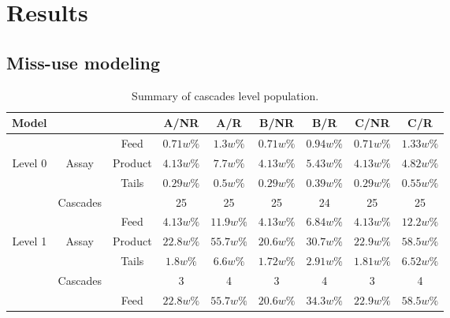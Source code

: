 \section{Results}

\subsection{Miss-use modeling}

\begin{table}[h!]
\centering
  \caption{Summary of cascades level population.}
\begin{tabular}{ccccccccc}
\toprule

Model       &        &           & A/NR      & A/R       & B/NR      & B/R      & C/NR       & C/R          \\
\midrule                                                                                                 
        &            & Feed      & $0.71w\%$ & $1.3w\%$  & $0.71w\%$ & $0.94w\%$ & $0.71w\%$ & $1.33w\%$ \\
Level 0 & Assay      & Product   & $4.13w\%$ & $7.7w\%$  & $4.13w\%$ & $5.43w\%$ & $4.13w\%$ & $4.82w\%$ \\
        &            & Tails     & $0.29w\%$ & $0.5w\%$  & $0.29w\%$ & $0.39w\%$ & $0.29w\%$ & $0.55w\%$ \\
        & Cascades   &           & 25        & 25        & 25        & 24        & 25        & 25        \\
\midrule                                                                                                 
        &            & Feed      & $4.13w\%$ & $11.9w\%$ & $4.13w\%$ & $6.84w\%$ & $4.13w\%$ & $12.2w\%$ \\
Level 1 & Assay      & Product   & $22.8w\%$ & $55.7w\%$ & $20.6w\%$ & $30.7w\%$ & $22.9w\%$ & $58.5w\%$ \\
        &            & Tails     & $1.8w\%$  & $6.6w\%$  & $1.72w\%$ & $2.91w\%$ & $1.81w\%$ & $6.52w\%$ \\
        & Cascades   &           & 3         & 4         & 3         & 4         & 3         & 4         \\
\midrule                                                                                                 
        &            & Feed      & $22.8w\%$ & $55.7w\%$ & $20.6w\%$ & $34.3w\%$ & $22.9w\%$ & $58.5w\%$ \\

\end{tabular}
\end{table}
